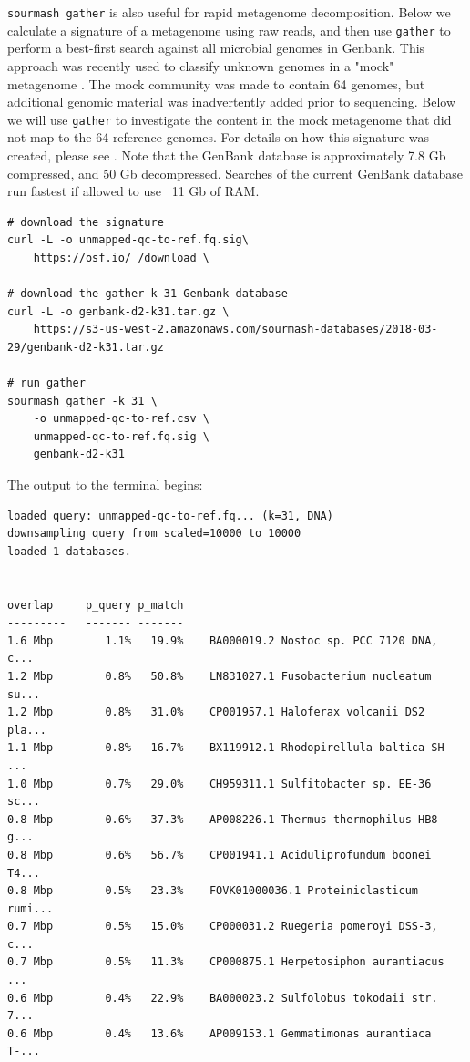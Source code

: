 \documentclass[10pt,a4paper,twocolumn]{article}
\begin{document}
\lstinline{sourmash gather} is also useful for rapid metagenome decomposition. Below we calculate a signature of a metagenome using raw reads, and then use \lstinline{gather} to perform a best-first search against all microbial genomes in Genbank. This approach was recently used to classify unknown genomes in a "mock" metagenome \cite{Shakya2013}. The mock community was made to contain 64 genomes, but additional genomic material was inadvertently added prior to sequencing. Below we will use \lstinline{gather} to investigate the content in the mock metagenome that did not map to the 64 reference genomes. For details on how this signature was created, please see \cite{Awad2017}. Note that the GenBank database is approximately 7.8 Gb compressed, and 50 Gb decompressed. Searches of the current GenBank database run fastest if allowed to use ~11 Gb of RAM.

\begin{lstlisting}
# download the signature
curl -L -o unmapped-qc-to-ref.fq.sig\ 
    https://osf.io/ /download \ 

# download the gather k 31 Genbank database
curl -L -o genbank-d2-k31.tar.gz \ 
    https://s3-us-west-2.amazonaws.com/sourmash-databases/2018-03-29/genbank-d2-k31.tar.gz
    
# run gather
sourmash gather -k 31 \ 
    -o unmapped-qc-to-ref.csv \ 
    unmapped-qc-to-ref.fq.sig \ 
    genbank-d2-k31
\end{lstlisting}

The output to the terminal begins:

\begin{lstlisting}[basicstyle=\tiny,]
loaded query: unmapped-qc-to-ref.fq... (k=31, DNA)
downsampling query from scaled=10000 to 10000
loaded 1 databases.


overlap     p_query p_match
---------   ------- -------
1.6 Mbp        1.1%   19.9%    BA000019.2 Nostoc sp. PCC 7120 DNA, c...
1.2 Mbp        0.8%   50.8%    LN831027.1 Fusobacterium nucleatum su...
1.2 Mbp        0.8%   31.0%    CP001957.1 Haloferax volcanii DS2 pla...
1.1 Mbp        0.8%   16.7%    BX119912.1 Rhodopirellula baltica SH ...
1.0 Mbp        0.7%   29.0%    CH959311.1 Sulfitobacter sp. EE-36 sc...
0.8 Mbp        0.6%   37.3%    AP008226.1 Thermus thermophilus HB8 g...
0.8 Mbp        0.6%   56.7%    CP001941.1 Aciduliprofundum boonei T4...
0.8 Mbp        0.5%   23.3%    FOVK01000036.1 Proteiniclasticum rumi...
0.7 Mbp        0.5%   15.0%    CP000031.2 Ruegeria pomeroyi DSS-3, c...
0.7 Mbp        0.5%   11.3%    CP000875.1 Herpetosiphon aurantiacus ...
0.6 Mbp        0.4%   22.9%    BA000023.2 Sulfolobus tokodaii str. 7...
0.6 Mbp        0.4%   13.6%    AP009153.1 Gemmatimonas aurantiaca T-...
\end{lstlisting}
\end{document}
